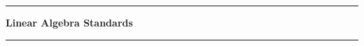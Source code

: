 \documentclass[letterpaper]{article}
\newcommand{\module}{?}
\newcommand{\setModule}[1]{\renewcommand{\module}{#1}}
\begin{document}
\pagestyle{empty}
\vspace{0.3in}
\hrule
\begin{center}\large \textbf{Linear Algebra Standards}\end{center}
\hrule
\vspace{0.1in}

\setModule{E}

\setModule{V}

\setModule{S}

\setModule{A}

\setModule{M}

\setModule{G}

\end{document}
